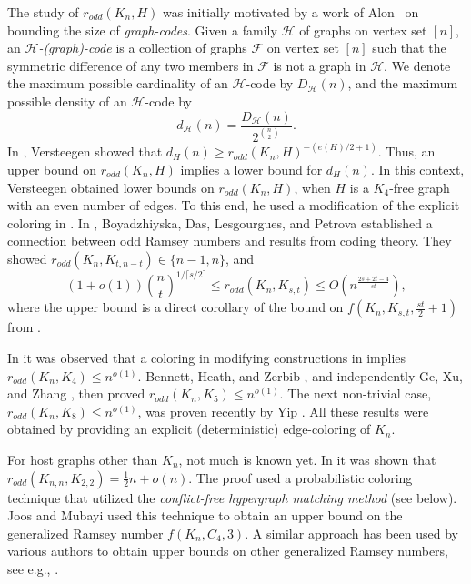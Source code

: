 \documentclass{article}
\theoremstyle{definition}
\newcommand\cF{{\mathcal F}}
\newcommand{\oram}{r_{odd}}
\begin{document}
The study of $\oram(K_n,H)$ was initially motivated by a work of Alon~\cite{alon-codes} on bounding the size of \emph{graph-codes}. 
Given a family $\mathcal{H}$ of graphs on vertex set $[n]$, an \emph{$\mathcal{H}$-(graph)-code} is a collection of graphs $\mathcal{F}$ on vertex set $[n]$ such that the symmetric difference of any two members in $\cF$ is not a graph in $\mathcal{H}$. We denote the maximum possible cardinality of an $\mathcal{H}$-code by $D_{\mathcal{H}}(n)$, and  the maximum possible density of an $\mathcal{H}$-code by $$d_{\mathcal{H}}(n) = \displaystyle\frac{D_{\mathcal{H}}(n)}{2^{\binom{n}{2}}}.$$ In \cite{Versteegen}, Versteegen showed that $d_{H}(n) \geq \oram(K_n,H)^{-(e(H)/2 + 1)}$.  Thus, an upper bound on $\oram(K_n,H)$ implies a lower bound for $d_H(n)$.    
In this context, Versteegen \cite{Versteegen} obtained lower bounds on $\oram(K_n,H)$, when $H$ is a $K_4$-free graph with an even number of edges. To this end, he used a modification of the explicit coloring in \cite{CH1}.
In \cite{BDLPodd}, Boyadzhiyska, Das, Lesgourgues, and Petrova established a connection between odd Ramsey numbers and results from coding theory.  They showed $\oram(K_n, K_{t,n-t}) \in \{n-1, n\}$, and $$ (1 + o(1)) \left( \frac{n}{t} \right)^{1/\lceil s/2 \rceil} \leq \oram \left(K_n, K_{s,t} \right) \leq O \left(n^{\frac{2s + 2t - 4}{st}} \right),$$ where the upper bound is a direct corollary of the bound on $f \left(K_n, K_{s,t}, \frac{st}{2} + 1 \right)$ from  \cite{AFM}. 

In \cite{alon-codes} it was observed that a coloring in \cite{CH1} modifying constructions in \cite{CFLS,Mubayi1}  implies $\oram(K_{n},K_4)\le n^{o(1)}$.  
Bennett, Heath, and Zerbib \cite{BHZ}, and independently Ge, Xu, and Zhang \cite{GXZ}, then proved $\oram(K_{n},K_5)\le n^{o(1)}$. The next non-trivial case, $\oram(K_n, K_8) \leq n^{o(1)}$, was proven recently by Yip \cite{Yip}. All these results were obtained by providing an explicit (deterministic) edge-coloring of $K_n$.  






   










For host graphs other than $K_n$, not much is known yet. In \cite{BHZ} it was shown that $\oram(K_{n,n},K_{2,2})=\frac{1}{2}n+o(n)$. The proof used a probabilistic coloring technique that utilized the {\em conflict-free hypergraph matching method} (see below).
 Joos and Mubayi \cite{JM} used this technique to obtain an upper bound on the generalized Ramsey number $f(K_n, C_4,3)$. 
 A similar approach has been used by various authors to obtain upper bounds on other generalized Ramsey numbers,  
 see e.g., \cite{BBHZ, BHZ, LM, GHPSZ}. 
\end{document}
